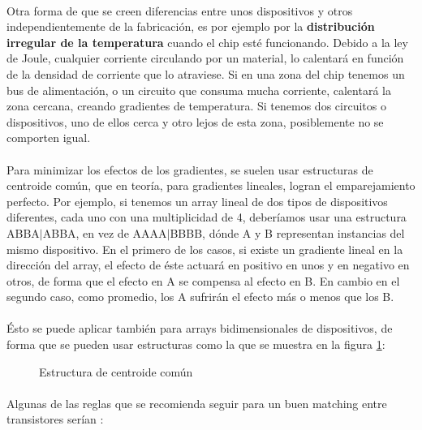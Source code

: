 \paragraph{}
Otra forma de que se creen diferencias entre unos dispositivos y otros
independientemente de la fabricación, es por ejemplo por la \textbf{distribución irregular
de la temperatura} cuando el chip esté funcionando. Debido a la ley de Joule, cualquier
corriente circulando por un material, lo calentará en función de la densidad de corriente
que lo atraviese. Si en una zona del chip tenemos un bus de alimentación, o un circuito
que consuma mucha corriente, calentará la zona cercana, creando gradientes de temperatura.
Si tenemos dos circuitos o dispositivos, uno de ellos cerca y otro lejos de esta zona,
posiblemente no se comporten igual.

\paragraph{}
Para minimizar los efectos de los gradientes, se suelen usar estructuras
de centroide común, que en teoría, para gradientes lineales, logran el emparejamiento
perfecto. Por ejemplo, si tenemos un array lineal de dos tipos de dispositivos diferentes,
cada uno con una multiplicidad de 4, deberíamos usar una estructura ABBA$\vert $ABBA, en vez
de AAAA$\vert $BBBB, dónde A y B representan instancias del mismo dispositivo. En el primero
de los casos, si existe un gradiente lineal en la dirección del array, el efecto de éste
actuará en positivo en unos y en negativo en otros, de forma que el efecto en A se compensa
al efecto en B. En cambio en el segundo caso, como promedio, los A sufrirán el efecto
más o menos que los B.

\paragraph{}
Ésto se puede aplicar también para arrays bidimensionales de dispositivos,
de forma que se pueden usar estructuras como la que se muestra en la figura \ref{fig:centroide_comun}:

\begin{figure}[h]
	\centering
	
	\caption{Estructura de centroide común}
	\label{fig:centroide_comun}
\end{figure}

\paragraph{}
Algunas de las reglas que se recomienda seguir para un buen matching entre transistores
serían \cite{Hastings2001:mos_matching}:

